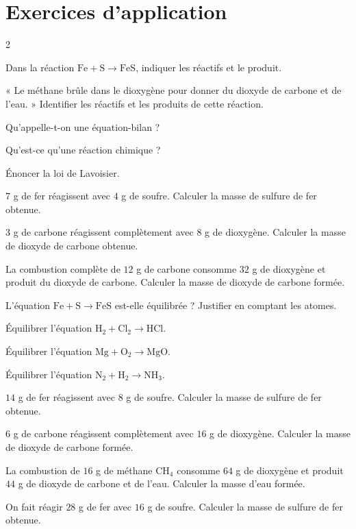 \section{Exercices d'application}
\begin{multicols}{2}

\exo{} Dans la réaction $\mathrm{Fe}+\mathrm{S}\to\mathrm{FeS}$, indiquer les
réactifs et le produit.

\exo{} « Le méthane brûle dans le dioxygène pour donner du dioxyde de carbone et
de l'eau. » Identifier les réactifs et les produits de cette réaction.

\exo{} Qu'appelle-t-on une équation-bilan ?

\exo{} Qu'est-ce qu'une réaction chimique ?

\exo{} Énoncer la loi de Lavoisier.

\exo{} $7$ g de fer réagissent avec $4$ g de soufre. Calculer la masse de sulfure
de fer obtenue.

\exo{} $3$ g de carbone réagissent complètement avec $8$ g de dioxygène. Calculer
la masse de dioxyde de carbone obtenue.

\exo{} La combustion complète de $12$ g de carbone consomme $32$ g de dioxygène et
produit du dioxyde de carbone. Calculer la masse de dioxyde de carbone formée.

\exo{} L'équation $\mathrm{Fe}+\mathrm{S}\to\mathrm{FeS}$ est-elle équilibrée ?
Justifier en comptant les atomes.

\exo{} Équilibrer l'équation $\mathrm{H_2}+\mathrm{Cl_2}\to\mathrm{HCl}$.

\exo{} Équilibrer l'équation $\mathrm{Mg}+\mathrm{O_2}\to\mathrm{MgO}$.

\exo{} Équilibrer l'équation $\mathrm{N_2}+\mathrm{H_2}\to\mathrm{NH_3}$.

\exo{} $14$ g de fer réagissent avec $8$ g de soufre. Calculer la masse de sulfure
de fer obtenue.

\exo{} $6$ g de carbone réagissent complètement avec $16$ g de dioxygène. Calculer
la masse de dioxyde de carbone formée.

\exo{} La combustion de $16$ g de méthane $\mathrm{CH_4}$ consomme $64$ g de
dioxygène et produit $44$ g de dioxyde de carbone et de l'eau. Calculer la masse d'eau
formée.

\exo{} On fait réagir $28$ g de fer avec $16$ g de soufre. Calculer la masse de
sulfure de fer obtenue.

\end{multicols}


